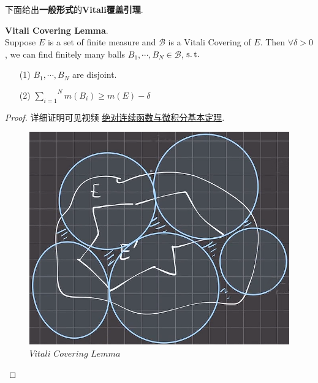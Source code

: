 	\vspace{2em}
	
	下面给出\textbf{一般形式}的\textbf{Vitali覆盖引理}.
	\begin{lemma}\label{lemma 4.7.1}
		\textbf{Vitali Covering Lemma}. \\
		Suppose $E$ is a set of finite measure and $\mathcal{B}$ is a Vitali Covering of $E$. Then $\forall \delta > 0$, we can find finitely many balls $B_1 , \cdots , B_N \in \mathcal{B}$, $\operatorname{s.t.}$
		\begin{enumerate}
			\item[(1)] $B_1 , \cdots , B_N$ are disjoint.
			
			\item[(2)] $\overset{N}{\underset{i = 1}{\sum}}{m(B_i)} \geq m(E) - \delta$
		\end{enumerate}
		
		\vspace{4em}
		\begin{proof}
			详细证明可见视频 \href{https://www.bilibili.com/video/BV1FT411C7wM/?p=39}{绝对连续函数与微积分基本定理}.
			
			\vspace{2em}
			
			\begin{figure}[thbp!]
				\centering
				\includegraphics[width=0.4\linewidth]{figure/4.7.2-1}
				\caption{$Vitali \,\, Covering \,\, Lemma$}
				\label{pic : 4.7.2-1} %
			\end{figure}
		\end{proof}
	\end{lemma}

